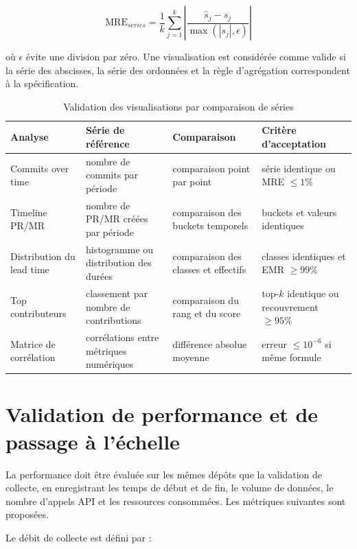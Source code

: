 \begin{equation}
\mathrm{MRE}_{series} = \frac{1}{k}\sum_{j=1}^{k}\left|\frac{\hat{s}_j-s_j}{\max(|s_j|,\epsilon)}\right|
\end{equation}

où $\epsilon$ évite une division par zéro. Une visualisation est considérée comme valide si la série des abscisses, la série des ordonnées et la règle d'agrégation correspondent à la spécification.

\begin{table}[H]
\centering
\small
\caption{Validation des visualisations par comparaison de séries}
\label{tab:validation-visualisations}
\begin{tabularx}{\textwidth}{|p{3cm}|X|X|X|}
\hline
\textbf{Analyse} & \textbf{Série de référence} & \textbf{Comparaison} & \textbf{Critère d'acceptation} \\
\hline
Commits over time & nombre de commits par période & comparaison point par point & série identique ou MRE $\leq 1\%$ \\
\hline
Timeline PR/MR & nombre de PR/MR créées par période & comparaison des buckets temporels & buckets et valeurs identiques \\
\hline
Distribution du lead time & histogramme ou distribution des durées & comparaison des classes et effectifs & classes identiques et EMR $\geq 99\%$ \\
\hline
Top contributeurs & classement par nombre de contributions & comparaison du rang et du score & top-$k$ identique ou recouvrement $\geq 95\%$ \\
\hline
Matrice de corrélation & corrélations entre métriques numériques & différence absolue moyenne & erreur $\leq 10^{-6}$ si même formule \\
\hline
\end{tabularx}
\end{table}

\section{Validation de performance et de passage à l'échelle}
\label{sec:validation-performance}

La performance doit être évaluée sur les mêmes dépôts que la validation de collecte, en enregistrant les temps de début et de fin, le volume de données, le nombre d'appels API et les ressources consommées. Les métriques suivantes sont proposées.

Le débit de collecte est défini par :


